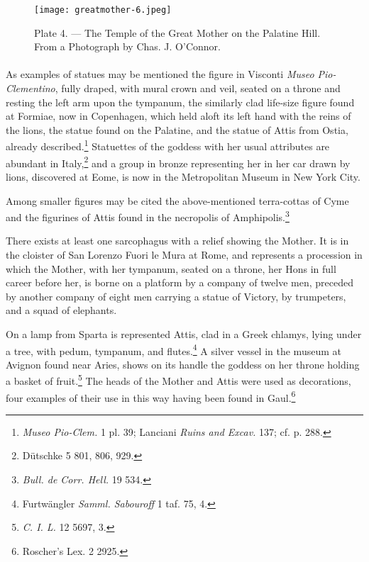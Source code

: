 \documentclass[a4paper, 11pt, oneside, polutonikogreek, english]{article}
\begin{document}
\clearpage
\begin{landscape}
\begin{figure}[H]
\centering
\texttt{[image: greatmother-6.jpeg]}
\caption{Plate 4. --- The Temple of the Great Mother on the Palatine Hill. From a Photograph by Chas. J. O'Connor.}
\end{figure}
\end{landscape}
\clearpage
\paragraph{}
As examples of statues may be mentioned the figure in Visconti \emph{Museo Pio-Clementino}, fully draped, with mural crown and veil, seated on a throne and resting the left arm upon the tympanum, the similarly clad life-size figure found at Formiae, now in Copenhagen, which held aloft its left hand with the reins of the lions, the statue found on the Palatine, and the statue of Attis from Ostia, already described.\footnote{\emph{Museo Pio-Clem.} 1 pl. 39; Lanciani \emph{Ruins and Excav.} 137; cf. p. 288.} Statuettes of the goddess with her usual attributes are abundant in Italy,\footnote{Dütschke 5 801, 806, 929.} and a group in bronze representing her in her car drawn by lions, discovered at Eome, is now in the Metropolitan Museum in New York City.

Among smaller figures may be cited the above-mentioned terra-cottas of Cyme and the figurines of Attis found in the necropolis of Amphipolis.\footnote{\emph{Bull. de Corr. Hell.} 19 534.}

There exists at least one sarcophagus with a relief showing the Mother. It is in the cloister of San Lorenzo Fuori le Mura at Rome, and represents a procession in which the Mother, with her tympanum, seated on a throne, her Hons in full career before her, is borne on a platform by a company of twelve men, preceded by another company of eight men carrying a statue of Victory, by trumpeters, and a squad of elephants.

On a lamp from Sparta is represented Attis, clad in a Greek chlamys, lying under a tree, with pedum, tympanum, and flutes.\footnote{Furtwängler \emph{Samml. Sabouroff} 1 taf. 75, 4.} A silver vessel in the museum at Avignon found near Aries, shows on its handle the goddess on her throne holding a basket of fruit.\footnote{\emph{C. I. L.} 12 5697, 3.} The heads of the Mother and Attis were used as decorations, four examples of their use in this way having been found in Gaul.\footnote{Roscher's Lex. 2 2925.}
\end{document}
